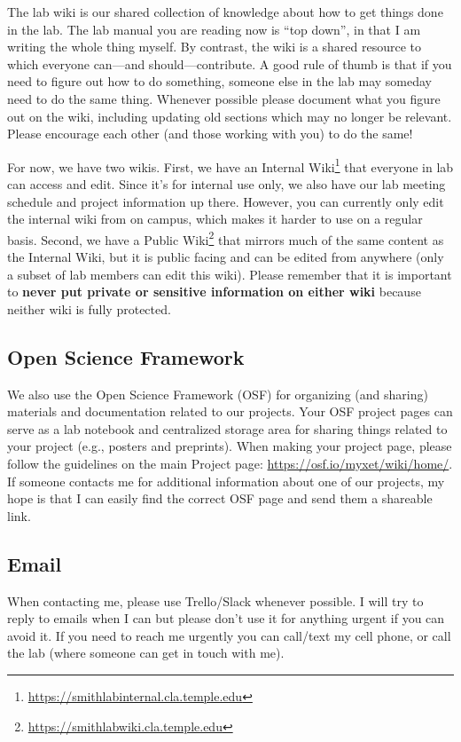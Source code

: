 \documentclass[letterpaper,12pt,oneside]{memoir}
\begin{document}
The lab wiki is our shared collection of knowledge about how to get things done in the lab. The lab manual you are reading now is ``top down'', in that I am writing the whole thing myself. By contrast, the wiki is a shared resource to which everyone can---and should---contribute. A good rule of thumb is that if you need to figure out how to do something, someone else in the lab may someday need to do the same thing. Whenever possible please document what you figure out on the wiki, including updating old sections which may no longer be relevant. Please encourage each other (and those working with you) to do the same!

For now, we have two wikis. First, we have an Internal Wiki\footnote{\url{https://smithlabinternal.cla.temple.edu}} that everyone in lab can access and edit. Since it's for internal use only, we also have our lab meeting schedule and project information up there. However, you can currently only edit the internal wiki from on campus, which makes it harder to use on a regular basis. Second, we have a Public Wiki\footnote{\url{https://smithlabwiki.cla.temple.edu}} that mirrors much of the same content as the Internal Wiki, but it is public facing and can be edited from anywhere (only a subset of lab members can edit this wiki). Please remember that it is important to \textbf{never put private or sensitive information on either wiki} because neither wiki is fully protected.  


\subsection{Open Science Framework}

We also use the Open Science Framework (OSF) for organizing (and sharing) materials and documentation related to our projects. Your OSF project pages can serve as a lab notebook and centralized storage area for sharing things related to your project (e.g., posters and preprints). When making your project page, please follow the guidelines on the main Project page: \url{https://osf.io/myxet/wiki/home/}. If someone contacts me for additional information about one of our projects, my hope is that I can easily find the correct OSF page and send them a shareable link.


\subsection{Email}
When contacting me, please use Trello/Slack whenever possible. I will try to reply to emails when I can but please don't use it for anything urgent if you can avoid it. If you need to reach me urgently you can call/text my cell phone, or call the lab (where someone can get in touch with me). 
\end{document}
